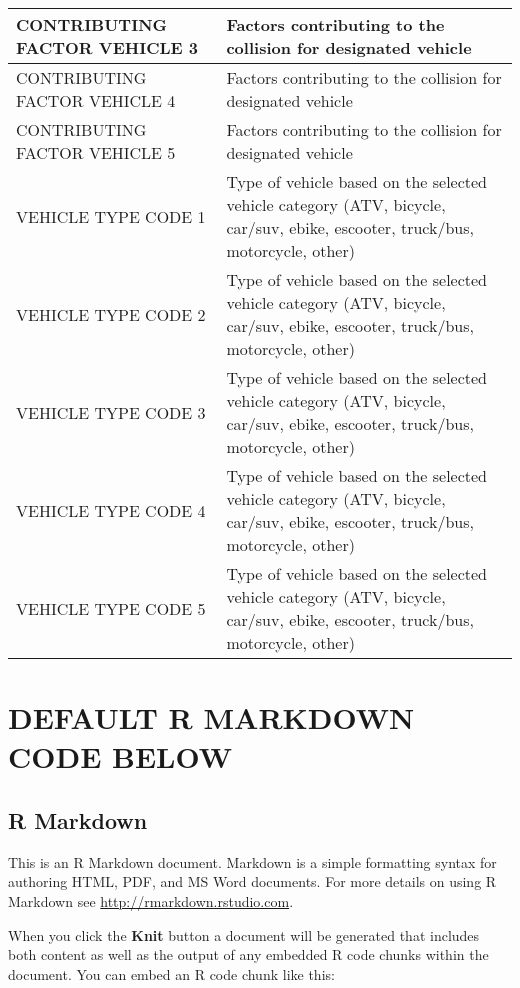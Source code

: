 \begin{table}
\begin{tabular}[t]{l|l}
\hline
CONTRIBUTING FACTOR VEHICLE 3 & Factors contributing to the collision for designated vehicle\\
\hline
CONTRIBUTING FACTOR VEHICLE 4 & Factors contributing to the collision for designated vehicle\\
\hline
CONTRIBUTING FACTOR VEHICLE 5 & Factors contributing to the collision for designated vehicle\\
\hline
VEHICLE TYPE CODE 1 & Type of vehicle based on the selected vehicle category (ATV, bicycle, car/suv, ebike, escooter, truck/bus, motorcycle, other)\\
\hline
VEHICLE TYPE CODE 2 & Type of vehicle based on the selected vehicle category (ATV, bicycle, car/suv, ebike, escooter, truck/bus, motorcycle, other)\\
\hline
VEHICLE TYPE CODE 3 & Type of vehicle based on the selected vehicle category (ATV, bicycle, car/suv, ebike, escooter, truck/bus, motorcycle, other)\\
\hline
VEHICLE TYPE CODE 4 & Type of vehicle based on the selected vehicle category (ATV, bicycle, car/suv, ebike, escooter, truck/bus, motorcycle, other)\\
\hline
VEHICLE TYPE CODE 5 & Type of vehicle based on the selected vehicle category (ATV, bicycle, car/suv, ebike, escooter, truck/bus, motorcycle, other)\\
\hline
\end{tabular}
\end{table}

\hypertarget{default-r-markdown-code-below}{%
\section{DEFAULT R MARKDOWN CODE
BELOW}\label{default-r-markdown-code-below}}

\hypertarget{r-markdown}{%
\subsection{R Markdown}\label{r-markdown}}

This is an R Markdown document. Markdown is a simple formatting syntax
for authoring HTML, PDF, and MS Word documents. For more details on
using R Markdown see \url{http://rmarkdown.rstudio.com}.

When you click the \textbf{Knit} button a document will be generated
that includes both content as well as the output of any embedded R code
chunks within the document. You can embed an R code chunk like this:

